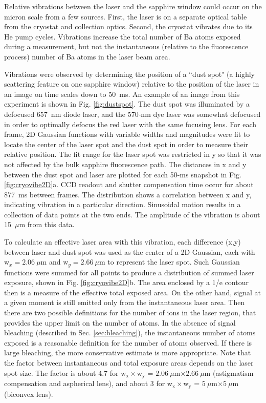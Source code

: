 Relative vibrations between the laser and the sapphire window could occur on the micron scale from a few sources.  First, the laser is on a separate optical table from the cryostat and collection optics.  Second, the cryostat vibrates due to its He pump cycles.  Vibrations increase the total number of Ba atoms exposed during a measurement, but not the instantaneous (relative to the fluorescence process) number of Ba atoms in the laser beam area.

Vibrations were observed by determining the position of a ``dust spot" (a highly scattering feature on one sapphire window) relative to the position of the laser in an image on time scales down to 50~ms.  An example of an image from this experiment is shown in Fig. \ref{fig:dustspot}.  The dust spot was illuminated by a defocused 657~nm diode laser, and the 570-nm dye laser was somewhat defocused in order to optimally defocus the red laser with the same focusing lens. For each frame, 2D Gaussian functions with variable widths and magnitudes were fit to locate the center of the laser spot and the dust spot in order to measure their relative position.  The fit range for the laser spot was restricted in y so that it was not affected by the bulk sapphire fluorescence path.  The distances in x and y between the dust spot and laser are plotted for each 50-ms snapshot in Fig. \ref{fig:cryovibe2D}a.  CCD readout and shutter compensation time occur for about 877~ms between frames.  The distribution shows a correlation between x and y, indicating vibration in a particular direction.  Sinusoidal motion results in a collection of data points at the two ends.  The amplitude of the vibration is about 15~$\mu$m from this data.

To calculate an effective laser area with this vibration, each difference (x,y) between laser and dust spot was used as the center of a 2D Gaussian, each with w$_{x} = 2.06~\mu$m and w$_{y} = 2.66~\mu$m to represent the laser spot.  Such Gaussian functions were summed for all points to produce a distribution of summed laser exposure, shown in Fig. \ref{fig:cryovibe2D}b.  The area enclosed by a 1/e contour then is a measure of the effective total exposed area.  On the other hand, signal at a given moment is still emitted only from the instantaneous laser area.  Then there are two possible definitions for the number of ions in the laser region, that provides the upper limit on the number of atoms.  In the absence of signal bleaching (described in Sec. \ref{sec:bleaching}), the instantaneous number of atoms exposed is a reasonable definition for the number of atoms observed.  If there is large bleaching, the more conservative estimate is more appropriate.  Note that the factor between instantaneous and total exposure areas depends on the laser spot size.  The factor is about 4.7 for w$_{\text{x}} \times $w$_{\text{y}}$ = $2.06~\mu$m$ \times 2.66~\mu$m (astigmatism compensation and aspherical lens), and about 3 for w$_{\text{x}} \times $w$_{\text{y}}$ = $5~\mu$m$ \times 5~\mu$m (biconvex lens).

